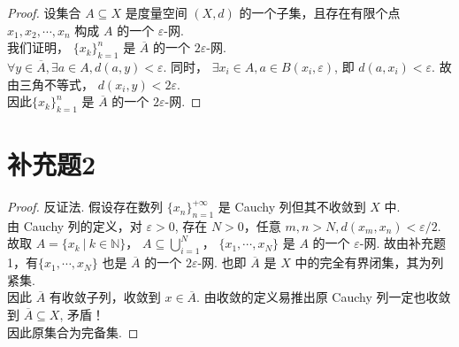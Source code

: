 \documentclass{article}
\begin{document}
\begin{proof}
    设集合 $A \subseteq X$ 是度量空间 $(X, d)$ 的一个子集，且存在有限个点 $x_1, x_2, \cdots, x_n$ 构成 $A$ 的一个 $\varepsilon$-网. \\
    我们证明， $\{x_k\}_{k = 1}^n$ 是 $\overline{A}$ 的一个 $2\varepsilon$-网. \\
    $\forall y \in \overline{A}, \exists a \in A, d(a, y) < \varepsilon$. 同时， $\exists x_i \in A, a \in B(x_i, \varepsilon)$, 即 $d(a, x_i) < \varepsilon$. 故由三角不等式， $d(x_i, y) < 2\varepsilon$. \\
    因此$\{x_k\}_{k = 1}^n$ 是 $\overline{A}$ 的一个 $2\varepsilon$-网.
\end{proof}

\section*{补充题2}

\begin{proof}
    反证法. 假设存在数列 $\{x_n\}_{n = 1}^{+\infty}$ 是 Cauchy 列但其不收敛到 $X$ 中. \\
    由 Cauchy 列的定义，对 $\varepsilon > 0$, 存在 $N > 0$，任意 $m, n > N, d(x_m, x_n) < \varepsilon/2$. 故取 $A = \{x_k\ |\ k \in \mathbb{N}\}$， $A \subseteq \bigcup_{i = 1}^N$， $\{x_1, \cdots, x_N\}$ 是 $A$ 的一个 $\varepsilon$-网. 故由补充题1，有$\{x_1, \cdots, x_N\}$ 也是 $\overline{A}$ 的一个 $2\varepsilon$-网. 也即 $\overline{A}$ 是 $X$ 中的完全有界闭集，其为列紧集. \\
    因此 $\overline{A}$ 有收敛子列，收敛到 $x \in \overline{A}$. 由收敛的定义易推出原 Cauchy 列一定也收敛到 $\overline{A} \subseteq X$, 矛盾！ \\
    因此原集合为完备集.
\end{proof}
\end{document}
